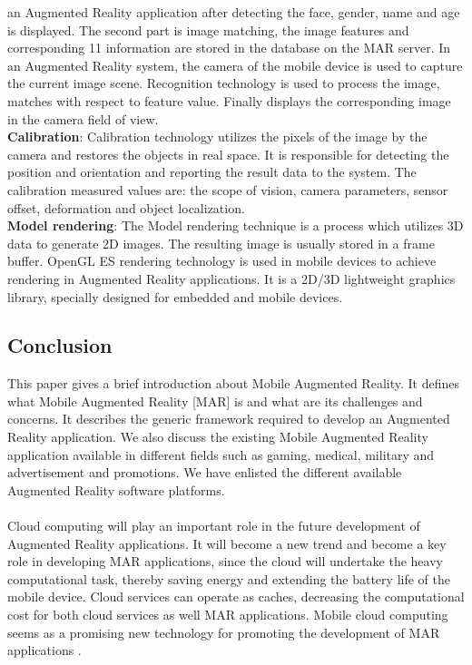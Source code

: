an Augmented Reality application after detecting the face, gender, name and age is 
displayed. The second part is image matching, the image features and corresponding 
11 
information are stored in the database on the MAR server. In an Augmented Reality 
system, the camera of the mobile device is used to capture the current image scene. 
Recognition technology is used to process the image, matches with respect to feature 
value. Finally displays the corresponding image in the camera field of view.  
    \\\textbf{Calibration}: Calibration technology utilizes the pixels of the image by the camera 
and restores the objects in real space. It is responsible for detecting the position and 
orientation and reporting the result data to the system. The calibration measured values 
are: the scope of vision, camera parameters, sensor offset, deformation and object 
localization. 
  \\\textbf{Model rendering}: The Model rendering technique is a process which utilizes 3D data 
to generate 2D images. The resulting image is usually stored in a frame buffer. OpenGL 
ES rendering technology is used in mobile devices to achieve rendering in Augmented 
Reality applications. It is a 2D/3D lightweight graphics library, specially designed for 
embedded and mobile devices.  
 \subsection{Conclusion}
 This paper gives a brief introduction about Mobile Augmented Reality. It defines what 
Mobile Augmented Reality [MAR] is and what are its challenges and concerns. It 
describes the generic framework required to develop an Augmented Reality application. 
We also discuss the existing Mobile Augmented Reality application available in different 
fields such as gaming, medical, military and advertisement and promotions. We have 
enlisted the different available Augmented Reality software platforms. 
  \paragraph{}  Cloud computing will play an important role in the future development of Augmented 
Reality applications. It will become a new trend and become a key role in developing 
MAR applications, since the cloud will undertake the heavy computational task, thereby 
saving energy and extending the battery life of the mobile device. Cloud services can 
operate as caches, decreasing the computational cost for both cloud services as well MAR 
applications. Mobile cloud computing seems as a promising new technology for 
promoting the development of MAR applications .
